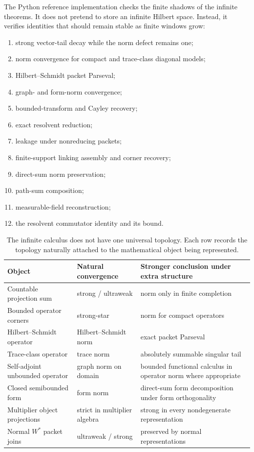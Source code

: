 \documentclass[11pt]{article}
\theoremstyle{definition}
\theoremstyle{remark}
\begin{document}
The Python reference implementation checks the finite shadows of the infinite theorems.  It does not pretend to store an infinite Hilbert space.  Instead, it verifies identities that should remain stable as finite windows grow:
\begin{enumerate}[label=\arabic*.]
\item strong vector-tail decay while the norm defect remains one;
\item norm convergence for compact and trace-class diagonal models;
\item Hilbert--Schmidt packet Parseval;
\item graph- and form-norm convergence;
\item bounded-transform and Cayley recovery;
\item exact resolvent reduction;
\item leakage under nonreducing packets;
\item finite-support linking assembly and corner recovery;
\item direct-sum norm preservation;
\item path-sum composition;
\item measurable-field reconstruction;
\item the resolvent commutator identity and its bound.
\end{enumerate}

\begin{table}[H]
\centering
\footnotesize
\setlength{\tabcolsep}{3pt}
\begin{tabular}{L{2.1in}L{1.2in}L{2.5in}}
\toprule
Object & Natural convergence & Stronger conclusion under extra structure\\
\midrule
Countable projection sum & strong / ultraweak & norm only in finite completion\\
Bounded operator corners & strong-star & norm for compact operators\\
Hilbert--Schmidt operator & Hilbert--Schmidt norm & exact packet Parseval\\
Trace-class operator & trace norm & absolutely summable singular tail\\
Self-adjoint unbounded operator & graph norm on domain & bounded functional calculus in operator norm where appropriate\\
Closed semibounded form & form norm & direct-sum form decomposition under form orthogonality\\
Multiplier object projections & strict in multiplier algebra & strong in every nondegenerate representation\\
Normal $W^*$ packet joins & ultraweak / strong & preserved by normal representations\\
\bottomrule
\end{tabular}
\caption{The infinite calculus does not have one universal topology.  Each row records the topology naturally attached to the mathematical object being represented.}
\end{table}
\end{document}
